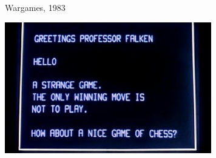 \documentclass{beamer} %
\begin{document}
  \begin{frame}
    Wargames, 1983
  \begin{center}
\includegraphics[width=90mm]{assets/wargames_chess_request.jpg}
\end{center}
\end{frame}


\end{document}
